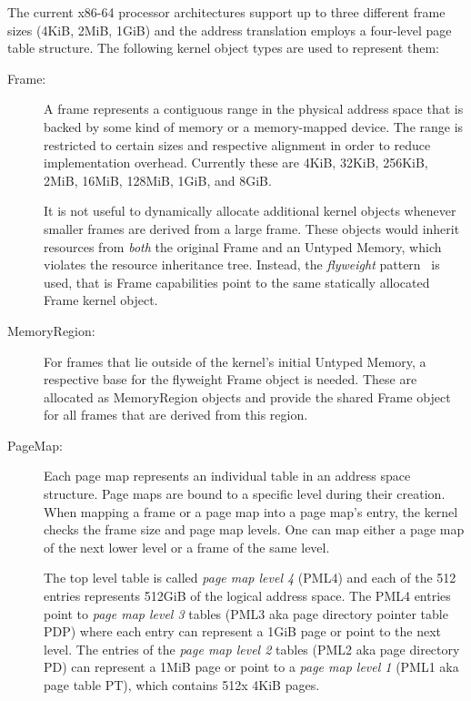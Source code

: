 The current x86-64 processor architectures support up to three different frame sizes (4KiB, 2MiB, 1GiB) and the address translation employs a four-level page table structure. The following kernel object types are used to represent them:

\begin{description}
\item[Frame:] A frame represents a contiguous range in the physical address space that is backed by some kind of memory or a memory-mapped device. The range is restricted to certain sizes and respective alignment in order to reduce implementation overhead. Currently these are 4KiB, 32KiB, 256KiB, 2MiB, 16MiB, 128MiB, 1GiB, and 8GiB.

It is not useful to dynamically allocate additional kernel objects whenever smaller frames are derived from a large frame. These objects would inherit resources from \emph{both} the original Frame and an Untyped Memory, which violates the resource inheritance tree. Instead, the \emph{flyweight} pattern~\cite{gof} is used, that is Frame capabilities point to the same statically allocated Frame kernel object.

\item[MemoryRegion:] For frames that lie outside of the kernel's initial Untyped Memory, a respective base for the flyweight Frame object is needed. These are allocated as MemoryRegion objects and provide the shared Frame object for all frames that are derived from this region.  

\item[PageMap:] Each page map represents an individual table in an address space structure. Page maps are bound to a specific level during their creation. When mapping a frame or a page map into a page map's entry, the kernel checks the frame size and page map levels. One can map either a page map of the next lower level or a frame of the same level.

The top level table is called \emph{page map level 4} (PML4) and each of the 512 entries represents 512GiB of the logical address space. The PML4 entries point to \emph{page map level 3} tables (PML3 aka page directory pointer table PDP) where each entry can represent a 1GiB page or point to the next level. The entries of the \emph{page map level 2} tables (PML2 aka page directory PD) can represent a 1MiB page or point to a \emph{page map level 1} (PML1 aka page table PT), which contains 512x 4KiB pages.


\end{description}
